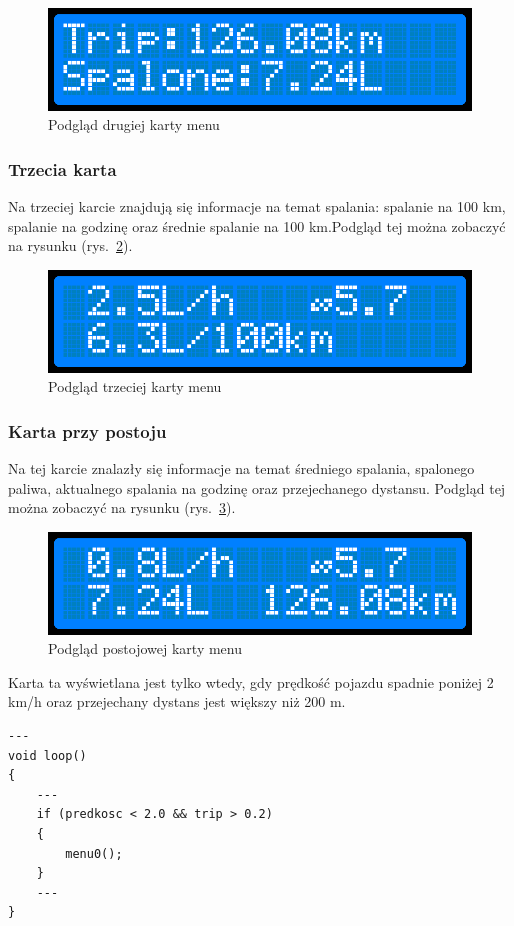\begin{figure}[!htb]
\centering
\includegraphics[width=0.7\linewidth]{Rysunki/menu2.png}
\caption{Podgląd drugiej karty menu}
\label{fig:menu2}
\end{figure}

\subsubsection{Trzecia karta}
Na trzeciej karcie znajdują się informacje na temat spalania: spalanie na 100 km, spalanie na godzinę oraz średnie spalanie na 100 km.Podgląd tej można zobaczyć na rysunku (rys.~\ref{fig:menu3}).

\begin{figure}[!htb]
\centering
\includegraphics[width=0.7\linewidth]{Rysunki/menu3.png}
\caption{Podgląd trzeciej karty menu}
\label{fig:menu3}
\end{figure}


\subsubsection{Karta przy postoju}
Na tej karcie znalazły się informacje na temat średniego spalania, spalonego paliwa, aktualnego spalania na godzinę oraz przejechanego dystansu. Podgląd tej można zobaczyć na rysunku (rys.~\ref{fig:menu0}).

\begin{figure}[!htb]
\centering
\includegraphics[width=0.7\linewidth]{Rysunki/menu0.png}
\caption{Podgląd postojowej karty menu}
\label{fig:menu0}
\end{figure}

Karta ta wyświetlana jest tylko wtedy, gdy prędkość pojazdu spadnie poniżej 2 km/h oraz przejechany dystans jest większy niż 200 m.
\begin{lstlisting}[label=list:menu_card4,caption=Włączanie karty podczas postoju,
basicstyle=\footnotesize\ttfamily]
---
void loop()
{
    ---
    if (predkosc < 2.0 && trip > 0.2)
    {
        menu0();
    }
    ---
}
\end{lstlisting}



